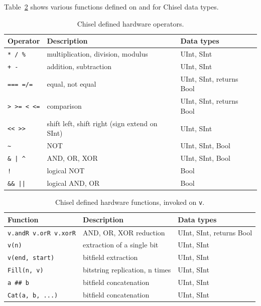 \documentclass[%
    10pt,
    headinclude, footexclude,
    openright, %
    notitlepage,
    cleardoubleempty,
    headsepline,
    pointlessnumbers,
    bibtotoc, idxtotoc,
    ]{scrbook}
\newcommand{\code}[1]{{\small{\texttt{#1}}}}
\begin{document}
Table~\ref{tab:functions} shows various functions defined on and for Chisel data types.

\begin{table}
 \centering
  \begin{tabular}{lll}
    \toprule
    Operator & Description & Data types \\
    \midrule
    \code{* / \%} & multiplication, division, modulus & UInt, SInt \\
    \code{+ -} & addition, subtraction & UInt, SInt \\
    \code{=== =/=} & equal, not equal & UInt, SInt, returns Bool \\
    \code{> >= < <=} & comparison & UInt, SInt, returns Bool \\
    \code{<< >>} & shift left, shift right (sign extend on SInt) & UInt, SInt \\
    \code{\~} & NOT & UInt, SInt, Bool \\
    \code{\& | \^} & AND, OR, XOR & UInt, SInt, Bool \\
    \code{!} & logical NOT & Bool \\
    \code{\&\& ||} & logical AND, OR & Bool \\
    \bottomrule 
  \end{tabular} 
  \caption{Chisel defined hardware operators.}
 \label{tab:operators}
\end{table}


\begin{table}
 \centering
  \begin{tabular}{lll}
    \toprule
    Function & Description & Data types \\
    \midrule
    \code{v.andR v.orR v.xorR} & AND, OR, XOR reduction & UInt, SInt, returns Bool \\
    \code{v(n)} & extraction of a single bit & UInt, SInt \\
    \code{v(end, start)} & bitfield extraction & UInt, SInt \\
    \code{Fill(n, v)} & bitstring replication, n times & UInt, SInt \\
    \code{a \#\# b} & bitfield concatenation & UInt, SInt \\
    \code{Cat(a, b, ...)} & bitfield concatenation & UInt, SInt \\
    \bottomrule 
  \end{tabular} 
  \caption{Chisel defined hardware functions, invoked on \code{v}.}
   \label{tab:functions}
\end{table}
\end{document}

